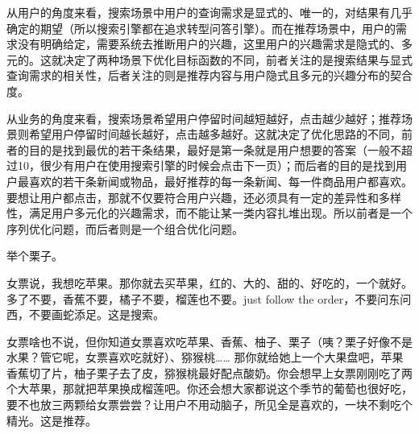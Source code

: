\documentclass{article}
\begin{document}
\begin{CJK*}{UTF8}{gbsn}
从用户的角度来看，搜索场景中用户的查询需求是显式的、唯一的，对结果有几乎确定的期望（所以搜索引擎都在追求转型问答引擎）。而在推荐场景中，用户的需求没有明确给定，需要系统去推断用户的兴趣，这里用户的兴趣需求是隐式的、多元的。这就决定了两种场景下优化目标函数的不同，前者关注的是搜索结果与显式查询需求的相关性，后者关注的则是推荐内容与用户隐式且多元的兴趣分布的契合度。

从业务的角度来看，搜索场景希望用户停留时间越短越好，点击越少越好；推荐场景则希望用户停留时间越长越好，点击越多越好。这就决定了优化思路的不同，前者的目的是找到最优的若干条结果，最好是第一条就是用户想要的答案（一般不超过10，很少有用户在使用搜索引擎的时候会点击下一页）；而后者的目的是找到用户最喜欢的若干条新闻或物品，最好推荐的每一条新闻、每一件商品用户都喜欢。要想让用户都点击，那就不仅要符合用户兴趣，还必须具有一定的差异性和多样性，满足用户多元化的兴趣需求，而不能让某一类内容扎堆出现。所以前者是一个序列优化问题，而后者则是一个组合优化问题。

举个栗子。

女票说，我想吃苹果。那你就去买苹果，红的、大的、甜的、好吃的，一个就好。多了不要，香蕉不要，橘子不要，榴莲也不要。just follow the order，不要问东问西，不要画蛇添足。这是搜索。

女票啥也不说，但你知道女票喜欢吃苹果、香蕉、柚子、栗子（咦？栗子好像不是水果？管它呢，女票喜欢吃就好）、猕猴桃…… 那你就给她上一个大果盘吧，苹果香蕉切了片，柚子栗子去了皮，猕猴桃最好配点酸奶。你会想早上女票刚刚吃了两个大苹果，那就把苹果换成榴莲吧。你还会想大家都说这个季节的葡萄也很好吃，要不也放三两颗给女票尝尝？让用户不用动脑子，所见全是喜欢的，一块不剩吃个精光。这是推荐。





\newpage
\end{CJK*}
\end{document}
